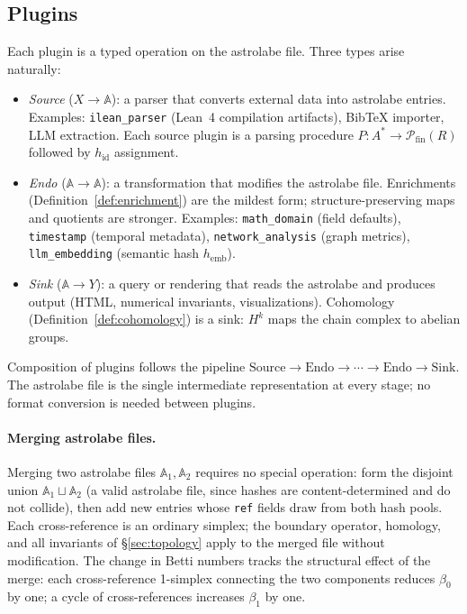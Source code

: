 \subsection{Plugins}

Each plugin is a typed operation on the astrolabe file. Three types arise naturally:
\begin{itemize}
\item \emph{Source} ($X \to \mathbb{A}$): a parser that converts external data into astrolabe entries. Examples: \texttt{ilean\_parser} (Lean~4 compilation artifacts), BibTeX importer, LLM extraction. Each source plugin is a parsing procedure $P : A^* \to \mathcal{P}_{\mathrm{fin}}(R)$ followed by $h_{\mathrm{id}}$ assignment.
\item \emph{Endo} ($\mathbb{A} \to \mathbb{A}$): a transformation that modifies the astrolabe file. Enrichments (Definition~\ref{def:enrichment}) are the mildest form; structure-preserving maps and quotients are stronger. Examples: \texttt{math\_domain} (field defaults), \texttt{timestamp} (temporal metadata), \texttt{network\_analysis} (graph metrics), \texttt{llm\_embedding} (semantic hash $h_{\mathrm{emb}}$).
\item \emph{Sink} ($\mathbb{A} \to Y$): a query or rendering that reads the astrolabe and produces output (HTML, numerical invariants, visualizations). Cohomology (Definition~\ref{def:cohomology}) is a sink: $H^k$ maps the chain complex to abelian groups.
\end{itemize}
Composition of plugins follows the pipeline $\text{Source} \to \text{Endo} \to \cdots \to \text{Endo} \to \text{Sink}$. The astrolabe file is the single intermediate representation at every stage; no format conversion is needed between plugins.

\paragraph{Merging astrolabe files.}
Merging two astrolabe files $\mathbb{A}_1, \mathbb{A}_2$ requires no special operation: form the disjoint union $\mathbb{A}_1 \sqcup \mathbb{A}_2$ (a valid astrolabe file, since hashes are content-determined and do not collide), then add new entries whose \texttt{ref} fields draw from both hash pools. Each cross-reference is an ordinary simplex; the boundary operator, homology, and all invariants of \S\ref{sec:topology} apply to the merged file without modification. The change in Betti numbers tracks the structural effect of the merge: each cross-reference 1-simplex connecting the two components reduces $\beta_0$ by one; a cycle of cross-references increases $\beta_1$ by one.

